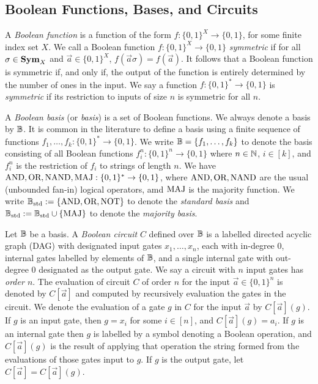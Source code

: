 \documentclass[../paper.tex]{subfiles}
\begin{document}
\subsection{Boolean Functions, Bases, and Circuits}
A \emph{Boolean function} is a function of the form $f: \{0,1\}^X \rightarrow
\{0,1\}$, for some finite index set $X$. We call a Boolean function $f:
\{0,1\}^X \rightarrow \{0,1\}$ \emph{symmetric} if for all $\sigma \in \text{\textbf{Sym}}_X$
and $\vec{a} \in \{0,1\}^X$, $f (\vec{a} \sigma) = f(\vec{a})$. It follows that
a Boolean function is symmetric if, and only if, the output of the function is
entirely determined by the number of ones in the input. We say a function $f :
\{0,1\}^{*} \rightarrow \{0,1\}$ is \emph{symmetric} if its restriction to
inputs of size $n$ is symmetric for all $n$.

A \emph{Boolean basis} (or \emph{basis}) is a set of Boolean functions. We
always denote a basis by $\mathbb{B}$. It is common in the literature to define a basis
using a finite sequence of functions $f_1, \ldots , f_k:\{0,1\}^* \rightarrow
\{0,1\}$. We write $\mathbb{B} = \{f_1, \ldots, f_k\}$ to denote the basis consisting
of all Boolean functions $f^n_i : \{0,1\}^n \rightarrow \{0,1\}$ where $n \in
\mathbb{N}$, $i \in [k]$, and $f^n_i$ is the restriction of $f_i$ to strings of
length $n$. We have $\text{\upshape AND}, \text{\upshape OR}, \text{\upshape NAND}, \text{\upshape MAJ} : \{0,1\}^* \rightarrow \{0,1\}$,
where $\text{\upshape AND}, \text{\upshape OR}, \text{\upshape NAND}$ are the usual (unbounded fan-in) logical operators, amd
$\text{\upshape MAJ}$ is the majority function. We write $\mathbb{B}_{\text{std}} := \{\text{\upshape AND}, \text{\upshape OR}, \text{\upshape NOT}\}$ to denote
the \emph{standard basis} and $\mathbb{B}_{\text{std}} := \mathbb{B}_{\text{std}} \cup \{\text{\upshape MAJ}\}$ to denote the
\emph{majority basis}.

Let $\mathbb{B}$ be a basis. A \emph{Boolean circuit} $C$ defined over $\mathbb{B}$ is a
labelled directed acyclic graph (DAG) with designated input gates $x_1, \ldots,
x_n$, each with in-degree $0$, internal gates labelled by elements of $\mathbb{B}$, and
a single internal gate with out-degree $0$ designated as the output gate. We say
a circuit with $n$ input gates has \emph{order $n$}. The evaluation of circuit
$C$ of order $n$ for the input $\vec{a} \in \{0,1\}^n$ is denoted by
$C[\vec{a}]$ and computed by recursively evaluation the gates in the circuit. We
denote the evaluation of a gate $g$ in $C$ for the input $\vec{a}$ by
$C[\vec{a}](g)$. If $g$ is an input gate, then $g = x_i$ for some $i \in [n]$,
and $C[\vec{a}](g) = a_i$. If $g$ is an internal gate then $g$ is labelled by a
symbol denoting a Boolean operation, and $C[\vec{a}](g)$ is the result of
applying that operation the string formed from the evaluations of those gates
input to $g$. If $g$ is the output gate, let $C[\vec{a}] = C[\vec{a}](g)$.
\end{document}
